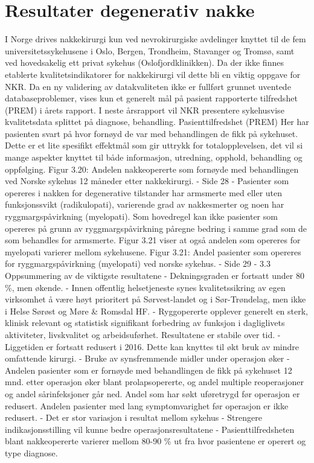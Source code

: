 \documentclass [norsk,a4paper,twoside]{article}\usepackage[]{graphicx}\usepackage[]{color}
\begin{document}
\section{Resultater degenerativ nakke}
I Norge drives nakkekirurgi kun ved nevrokirurgiske avdelinger knyttet til de fem
universitetssykehusene i Oslo, Bergen, Trondheim, Stavanger og Tromsø, samt ved
hovedsakelig ett privat sykehus (Oslofjordklinikken).
Da der ikke finnes etablerte kvalitetsindikatorer for nakkekirurgi vil dette bli en
viktig oppgave for NKR. Da en ny validering av datakvaliteten ikke er fullført grunnet
uventede databaseproblemer, vises kun et generelt mål på pasient rapporterte
tilfredshet (PREM) i årets rapport. I neste årsrapport vil NKR presentere sykehusvise
kvalitetsdata splittet på diagnose, behandling.
Pasienttilfredshet (PREM)
Her har pasienten svart på hvor fornøyd de var med behandlingen de fikk på
sykehuset. Dette er et lite spesifikt effektmål som gir uttrykk for totalopplevelsen,
det vil si mange aspekter knyttet til både informasjon, utredning, opphold,
behandling og oppfølging.
Figur 3.20: Andelen nakkeopererte som fornøyde med behandlingen ved Norske
sykehus 12 måneder etter nakkekirurgi.
- Side 28 -
Pasienter som opereres i nakken for degenerative tilstander har armsmerte med
eller uten funksjonssvikt (radikulopati), varierende grad av nakkesmerter og noen
har ryggmargspåvirkning (myelopati). Som hovedregel kan ikke pasienter som
opereres på grunn av ryggmargspåvirkning påregne bedring i samme grad som de
som behandles for armsmerte. Figur 3.21 viser at også andelen som opereres for
myelopati varierer mellom sykehusene.
Figur 3.21: Andel pasienter som opereres for ryggmargspåvirkning (myelopati) ved
norske sykehus.
- Side 29 -
3.3 Oppsummering av de viktigste resultatene
- Dekningsgraden er fortsatt under 80 \%, men økende.
- Innen offentlig helsetjeneste synes kvalitetssikring av egen virksomhet å
være høyt prioritert på Sørvest-landet og i Sør-Trøndelag, men ikke i Helse
Sørøst og Møre & Romsdal HF.
- Ryggopererte opplever generelt en sterk, klinisk relevant og statistisk
signifikant forbedring av funksjon i dagliglivets aktiviteter, livskvalitet og
arbeidsuførhet. Resultatene er stabile over tid.
- Liggetiden er fortsatt redusert i 2016. Dette kan knyttes til økt bruk av
mindre omfattende kirurgi.
- Bruke av synsfremmende midler under operasjon øker
- Andelen pasienter som er fornøyde med behandlingen de fikk på sykehuset
12 mnd. etter operasjon øker blant prolapsopererte, og andel multiple
reoperasjoner og andel sårinfeksjoner går ned. Andel som har søkt
uføretrygd før operasjon er redusert. Andelen pasienter med lang
symptomvarighet før operasjon er ikke redusert.
- Det er stor variasjon i resultat mellom sykehus
- Strengere indikasjonsstilling vil kunne bedre operasjonsresultatene
- Pasienttilfredsheten blant nakkeopererte varierer mellom 80-90 \% ut fra
hvor pasientene er operert og type diagnose.
\end{document}
